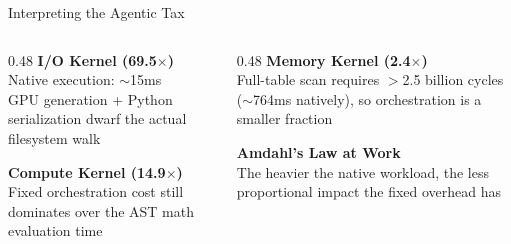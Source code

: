 \documentclass[aspectratio=169, 12pt]{beamer}
\newcommand{\iconWarn}{\textcolor{accentRed}{$\blacktriangle$}}
\begin{document}
\begin{frame}{Interpreting the Agentic Tax}
  \vspace{6pt}
  \begin{center}
  \end{center}
  \vspace{6pt}
  \begin{columns}[T]
    \begin{column}{0.48\textwidth}
      {\color{accentPurple}\bfseries\small I/O Kernel (69.5$\times$)}\\[4pt]
      {\color{textSecondary}\scriptsize Native execution: $\sim$15ms\\
      GPU generation + Python serialization dwarf the actual filesystem walk}
      \vspace{8pt}
      
      {\color{accentOrange}\bfseries\small Compute Kernel (14.9$\times$)}\\[4pt]
      {\color{textSecondary}\scriptsize Fixed orchestration cost still dominates over the AST math evaluation time}
    \end{column}
    \begin{column}{0.48\textwidth}
      {\color{accentGreen}\bfseries\small Memory Kernel (2.4$\times$)}\\[4pt]
      {\color{textSecondary}\scriptsize Full-table scan requires $>$2.5 billion cycles ($\sim$764ms natively), so orchestration is a smaller fraction}
      \vspace{8pt}
      
      {\color{accentCyan}\bfseries\small Amdahl's Law at Work}\\[4pt]
      {\color{textSecondary}\scriptsize The heavier the native workload, the less proportional impact the fixed overhead has}
    \end{column}
  \end{columns}
\end{frame}
\end{document}

